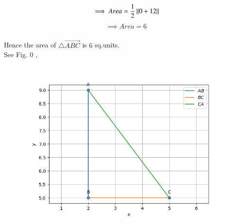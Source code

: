 \documentclass[journal]{IEEEtran}
\begin{document}
\begin{align}
\implies Area = \frac{1}{2}\norm{0 + 12}
\end{align}
\begin{align}
\implies Area = 6
\end{align}\\
Hence the area of $\triangle \vec{ABC}$ is $6$ sq.units.\\
See Fig. 0 ,
\begin{figure}[H]
\begin{center}
\includegraphics[width=0.6\columnwidth]{figs/fig.png}
\end{center}
\caption{}
\label{fig:Fig1}
\end{figure}
\end{document}
